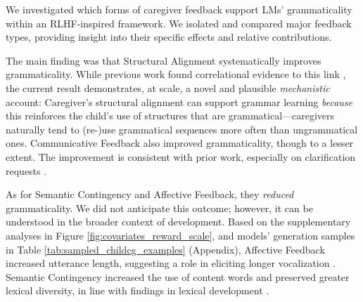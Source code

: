 We investigated which forms of caregiver feedback support LMs' grammaticality within an RLHF-inspired framework. We isolated and compared major feedback types, providing insight into their specific effects and relative contributions.

The main finding was that Structural Alignment systematically improves grammaticality. While previous work found correlational evidence to this link \cite{fusaroli_caregiver_2023}, the current result demonstrates, at scale, a novel and plausible \textit{mechanistic} account: Caregiver's structural alignment can support grammar learning \textit{because} this reinforces the child's use of structures that are grammatical---caregivers naturally tend to (re-)use grammatical sequences more often than ungrammatical ones.
Communicative Feedback also improved grammaticality, though to a lesser extent. The improvement is consistent with prior work, especially on clarification requests \cite{nikolaus_fourtassi_2026, clark_conversational_2020}. 

As for Semantic Contingency and Affective Feedback, they  \textit{reduced} grammaticality. We did not anticipate this outcome; however, it can be understood in the broader context of development.
Based on the supplementary analyses in Figure \ref{fig:covariates_reward_scale}, and models' generation samples in Table \ref{tab:sampled_childcg_examples} (Appendix), Affective Feedback increased utterance length, suggesting a role in eliciting
longer vocalization \cite[see also][]{goldstein2003social}. Semantic Contingency increased the use of content words and preserved greater lexical diversity, in line with findings in lexical development \cite{che2018assessing}.


